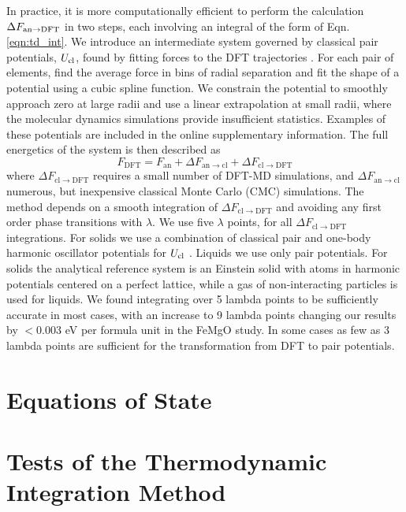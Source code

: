 In practice, it is more computationally efficient to perform the calculation $\Delta
F_{\rm an\to DFT}$ in two steps, each involving an integral of the form of Eqn.
\ref{eqn:td_int}. We introduce an intermediate system governed by classical pair
potentials, $U_{\rm cl}$, found by fitting forces to the DFT trajectories
\citep{Wilson2010,Izvekov2004}. For each pair of elements, find the average force in bins
of radial separation and fit the shape of a potential using a cubic spline function. We
constrain the potential to smoothly approach zero at large radii and use a linear
extrapolation at small radii, where the molecular dynamics simulations provide
insufficient statistics. Examples of these potentials are included in the online
supplementary information. The full energetics of the system is then described as
\begin{equation} \label{eqn:two_step}
F_{\mathrm{DFT}}=F_{\mathrm{\mathrm{an}}}+\Delta
F_{\mathrm{an} \to \mathrm{cl}}+\Delta F_{\mathrm{cl}\to \mathrm{DFT}}
\end{equation}
where $\Delta F_{\mathrm{cl}\to \mathrm{DFT}}$ requires a small number of DFT-MD
simulations, and $\Delta F_{\mathrm{an} \to \mathrm{cl}}$ numerous, but inexpensive
classical Monte Carlo (CMC) simulations. The method depends on a smooth integration
of $\Delta F_{\mathrm{cl}\to \mathrm{DFT}}$ and avoiding any first order phase
transitions with $\lambda$.  We use five $\lambda$ points, for all $\Delta
F_{\mathrm{cl}\to \mathrm{DFT}}$ integrations. For solids we use a combination of
classical pair and one-body harmonic oscillator potentials for $U_{\rm cl}$
\citep{Wilson2012a,Wahl2013}.  Liquids we use only pair potentials. For solids the
analytical reference system is an Einstein solid with atoms in harmonic potentials
centered on a perfect lattice, while a gas of non-interacting particles is used for
liquids. We found integrating over 5 lambda points to be sufficiently accurate in
most cases, with an increase to 9 lambda points changing our results by $<0.003$ eV
per formula unit in the FeMgO study. In some cases as few as 3 lambda points are
sufficient for the transformation from DFT to pair potentials. 

\section{Equations of State}


\section{Tests of the Thermodynamic Integration Method}

